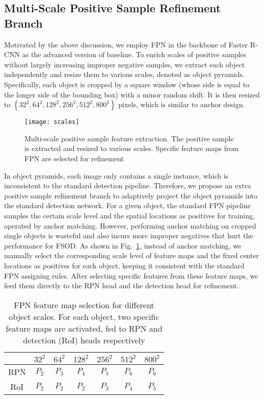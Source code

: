 \documentclass[runningheads]{llncs}
\begin{document}
\subsection{Multi-Scale Positive Sample Refinement Branch}
Motivated by the above discussion, we employ FPN in the backbone of Faster R-CNN as the advanced version of baseline.
To enrich scales of positive samples without largely increasing improper negative samples, we extract each object independently and resize them to various scales, denoted as object pyramids.
Specifically, each object is cropped by a square window (whose side is equal to the longer side of the bounding box) with a minor random shift. It is then resized to $\left\{ 32^{2},64^{2},128^{2},256^{2},512^{2},800^{2} \right\}$ pixels, which is similar to anchor design. 
\begin{figure}
	\centering
	\texttt{[image: scales]}
	\caption{Multi-scale positive sample feature extraction. The positive sample is extracted and resized to various scales. Specific feature maps from FPN are selected for refinement}
	\label{fig:scales}
\end{figure}

In object pyramids, each image only contains a single instance, which is inconsistent to the standard detection pipeline.
Therefore, we propose an extra positive sample refinement branch to adaptively project the object pyramids into the standard detection network.
For a given object, the standard FPN pipeline samples the certain scale level and the spatial locations as positives for training, operated by anchor matching.
However, performing anchor matching on cropped single objects is wasteful and also incurs more improper negatives that hurt the performance for FSOD.
As shown in Fig.~\ref{fig:scales}, instead of anchor matching, we manually select the corresponding scale level of feature maps and the fixed center locations as positives for each object, keeping it consistent with the standard FPN assigning rules.
After selecting specific features from these feature maps, we feed them directly to the RPN head and the detection head for refinement.
\setlength{\tabcolsep}{4pt}
\begin{table}
	\begin{center}
		\caption{FPN feature map selection for different object scales. For each object, two specific feature maps are activated, fed to RPN and detection (RoI) heads respectively}
		\label{table:scalereftable}
		\begin{tabular}{c|cccccc}
			\hline
			& $32^{2}$ & $64^{2}$ & $128^{2}$ & $256^{2}$ & $512^{2}$ & $800^{2}$ \\
			\hline
			RPN & $P_{2}$ & $P_{3}$ & $P_{4}$  & $P_{5}$  & $P_{6}$  & $P_{6}$  \\
			RoI & $P_{2}$ & $P_{2}$ & $P_{2}$  & $P_{3}$  & $P_{4}$  & $P_{5}$  \\
			\hline
		\end{tabular}
	\end{center}
\end{table}
\setlength{\tabcolsep}{1.4pt}
\end{document}
